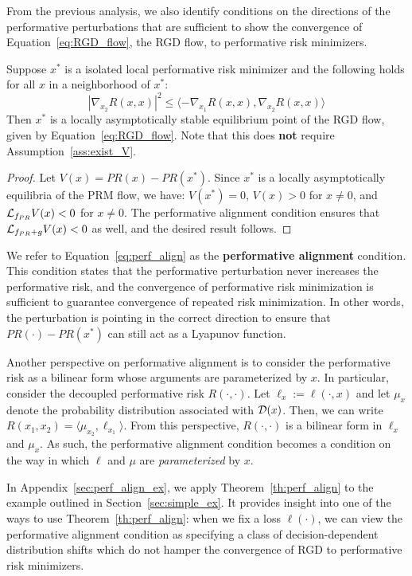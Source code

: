 
From the previous analysis, we also identify conditions on the directions of the performative perturbations that are sufficient to show the convergence of Equation~\eqref{eq:RGD_flow}, the RGD flow, to performative risk minimizers.

\begin{theorem}
\label{th:perf_align}
Suppose $x^*$ is a isolated local performative risk minimizer and the following holds for all $x$ in a neighborhood of $x^*$:
\begin{equation}
\label{eq:perf_align}
|\nabla_{x_2}R(x,x)|^2 \le \langle -\nabla_{x_1}R(x,x), \nabla_{x_2}R(x,x) \rangle
\end{equation}
Then $x^*$ is a locally asymptotically stable equilibrium point of the RGD flow, given by Equation~\eqref{eq:RGD_flow}. 
Note that this does \textbf{not} require Assumption~\ref{ass:exist_V}.
\end{theorem}

\begin{proof}
Let $V(x) = PR(x) - PR(x^*)$. 
Since $x^*$ is a locally asymptotically equilibria of the PRM flow, we have: $V(x^*) = 0$, $V(x) > 0$ for $x \neq 0$, and $\mathcal{L}_{f_{PR}} V(x) < 0$ for $x \neq 0$. The performative alignment condition ensures that $\mathcal{L}_{f_{PR} + g} V(x) < 0$ as well, and the desired result follows.
\end{proof}

We refer to Equation~\eqref{eq:perf_align} as the \textbf{performative alignment} condition. This condition states that the performative perturbation never increases the performative risk, and the convergence of performative risk minimization is sufficient to guarantee convergence of repeated risk minimization. In other words, the perturbation is pointing in the correct direction to ensure that $PR(\cdot) - PR(x^*)$ can still act as a Lyapunov function.

Another perspective on performative alignment is to consider the performative risk as a bilinear form whose arguments are parameterized by $x$. In particular, consider the decoupled performative risk $R(\cdot,\cdot)$. Let $\ell_{x} := \ell(\cdot, x)$ and let $\mu_x$ denote the probability distribution associated with $\mathcal{D}(x)$. Then, we can write $R(x_1,x_2) = \langle \mu_{x_2}, \ell_{x_1} \rangle$. From this perspective, $R(\cdot,\cdot)$ is a bilinear form in $\ell_x$ and $\mu_x$. As such, the performative alignment condition becomes a condition on the way in which $\ell$ and $\mu$ are \textit{parameterized} by $x$.

In Appendix~\ref{sec:perf_align_ex}, we apply Theorem~\ref{th:perf_align} to the example outlined in Section~\ref{sec:simple_ex}. It provides insight into one of the ways to use Theorem~\ref{th:perf_align}: when we fix a loss $\ell(\cdot)$, we can view the performative alignment condition as specifying a class of decision-dependent distribution shifts which do not hamper the convergence of RGD to performative risk minimizers.
